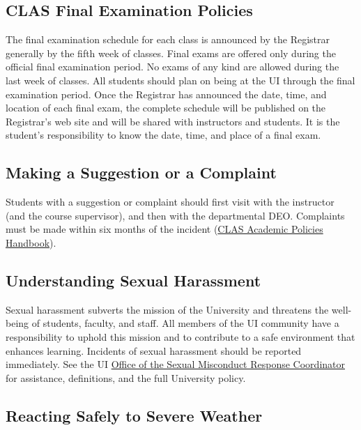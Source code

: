 \documentclass[11pt,]{article}
\theoremstyle{definition}
\theoremstyle{definition}
\theoremstyle{remark}
\begin{document}
\subsection{CLAS Final Examination
Policies}\label{clas-final-examination-policies}

The final examination schedule for each class is announced by the
Registrar generally by the fifth week of classes. Final exams are
offered only during the official final examination period. No exams of
any kind are allowed during the last week of classes. All students
should plan on being at the UI through the final examination period.
Once the Registrar has announced the date, time, and location of each
final exam, the complete schedule will be published on the Registrar's
web site and will be shared with instructors and students. It is the
student's responsibility to know the date, time, and place of a final
exam.

\subsection{Making a Suggestion or a
Complaint}\label{making-a-suggestion-or-a-complaint}

Students with a suggestion or complaint should first visit with the
instructor (and the course supervisor), and then with the departmental
DEO. Complaints must be made within six months of the incident
(\href{https://clas.uiowa.edu/students/handbook}{CLAS Academic Policies
Handbook}).

\subsection{Understanding Sexual
Harassment}\label{understanding-sexual-harassment}

Sexual harassment subverts the mission of the University and threatens
the well-being of students, faculty, and staff. All members of the UI
community have a responsibility to uphold this mission and to contribute
to a safe environment that enhances learning. Incidents of sexual
harassment should be reported immediately. See the UI
\href{https://osmrc.uiowa.edu/}{Office of the Sexual Misconduct Response
Coordinator} for assistance, definitions, and the full University
policy.

\subsection{Reacting Safely to Severe
Weather}\label{reacting-safely-to-severe-weather}
\end{document}
